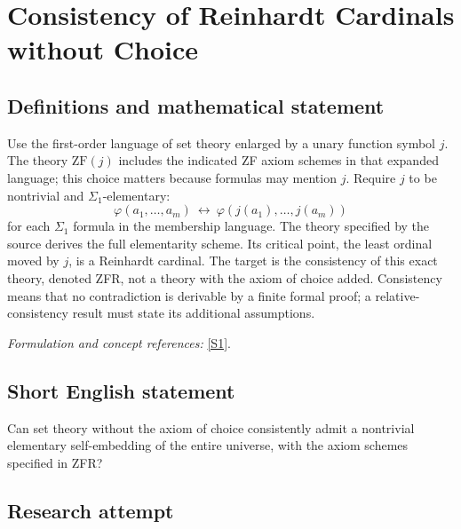 \documentclass[11pt]{article}
\newcommand{\sref}[2]{\hyperlink{source:#1:#2}{[S#2]}}
\newif\ifshowcatalogue
\newcommand{\cataloguescope}[1]{\ifshowcatalogue
 \paragraph{Exact scope in the supplied catalogue.}
 \begin{quote}\small #1\end{quote}\fi}
\begin{document}
\setcounter{section}{151}
\clearpage
\section{\texorpdfstring{Consistency of Reinhardt Cardinals without Choice}{Consistency of Reinhardt Cardinals without Choice}}\label{152}
\subsection{Definitions and mathematical statement}
Use the first-order language of set theory enlarged by a unary function symbol $j$. The theory $\mathrm{ZF}(j)$ includes the indicated ZF axiom schemes in that expanded language; this choice matters because formulas may mention $j$. Require $j$ to be nontrivial and $\Sigma_1$-elementary:
\[
 \varphi(a_1,\ldots,a_m)\ \longleftrightarrow\
 \varphi(j(a_1),\ldots,j(a_m))
\]
for each $\Sigma_1$ formula in the membership language. The theory specified by the source derives the full elementarity scheme. Its critical point, the least ordinal moved by $j$, is a Reinhardt cardinal. The target is the consistency of this exact theory, denoted ZFR, not a theory with the axiom of choice added. Consistency means that no contradiction is derivable by a finite formal proof; a relative-consistency result must state its additional assumptions.
\par\smallskip\textit{Formulation and concept references:} \sref{152}{1}.
\cataloguescope{Determine whether ZFR is consistent, where ZFR is the first-order theory ZF(j) plus the assertion that a nontrivial function symbol j:V->V is Sigma\_1-elementary and hence fully elementary as a theorem scheme.}
\subsection{Short English statement}
Can set theory without the axiom of choice consistently admit a nontrivial elementary self-embedding of the entire universe, with the axiom schemes specified in ZFR?
\subsection{Research attempt}
\end{document}

